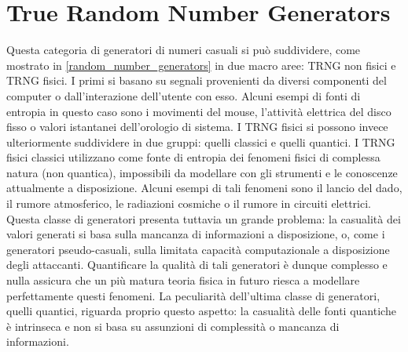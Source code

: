 \section{True Random Number Generators}
Questa categoria di generatori di numeri casuali si può suddividere, come mostrato in \ref{random_number_generators} in due macro aree: TRNG non fisici e TRNG fisici. I primi si basano su segnali provenienti da diversi componenti del computer o dall'interazione dell'utente con esso. Alcuni esempi di fonti di entropia in questo caso sono i movimenti del mouse, l'attività elettrica del disco fisso o valori istantanei dell'orologio di sistema. I TRNG fisici si possono invece ulteriormente suddividere in due gruppi: quelli classici e quelli quantici. I TRNG fisici classici utilizzano come fonte di entropia dei fenomeni fisici di complessa natura (non quantica), impossibili da modellare con gli strumenti e le conoscenze attualmente a disposizione. Alcuni esempi di tali fenomeni sono il lancio del dado, il rumore atmosferico, le radiazioni cosmiche o il rumore in circuiti elettrici. Questa classe di generatori presenta tuttavia un grande problema: la casualità dei valori generati si basa sulla mancanza di informazioni a disposizione, o, come i generatori pseudo-casuali, sulla limitata capacità computazionale a disposizione degli attaccanti. Quantificare la qualità di tali generatori è dunque complesso e nulla assicura che un più matura teoria fisica in futuro riesca a modellare perfettamente questi fenomeni. La peculiarità dell'ultima classe di generatori, quelli quantici, riguarda proprio questo aspetto: la casualità delle fonti quantiche è intrinseca e non si basa su assunzioni di complessità o mancanza di informazioni.